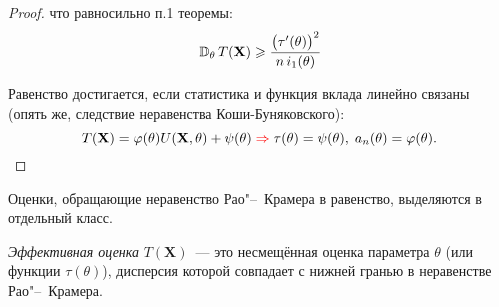\begin{proof}
    что равносильно п.1 теоремы:
    \begin{equation*}
        \mathbb{D}_{\theta}\, T(\mathbf{X}) \geqslant \cfrac{\bigl(\tau'(\theta)\bigr)^{2}}{n \, i_1(\theta)}
    \end{equation*}

    Равенство достигается, если статистика и функция вклада линейно связаны (опять же, следствие неравенства Коши-Буняковского):
    \begin{equation}
        \label{connection_of_efficient_estimator_and_score}
        T(\mathbf{X})=\varphi(\theta) U(\mathbf{X}, \theta)+\psi(\theta) 
        \; {\color{red}\Rightarrow } \;
        \tau(\theta)=\psi(\theta), \; a_{n}(\theta)=\varphi(\theta).
    \end{equation}
\end{proof}

\iffalse
    Рассмотрим некоторый класс оценок $K=\left\{\hat{\theta}\left(\mathbf{X}\right)\right\}$ параметра $\theta$.
    \begin{defn}
        Говорят, что оценка $\theta^{*}\left(\mathbf{X}\right) \in K$ является эффективной оценкой параметра $\theta$ в классе $K$, если для любой другой оценки $\hat{\theta} \in K$ имеет место неравенство:
        \begin{equation*}
            E\left(\theta^{*}-\theta\right)^{2} \leqslant \MExp(\hat{\theta}-\theta)^{2}~ \forall \theta \in \Theta
        \end{equation*}
    \end{defn}
    Обозначим класс несмещённых оценок:
    \begin{equation*}
        K_{0}=\left\{\hat{\theta}\left(\mathbf{X}\right): E \hat{\theta}=\theta, \forall \theta \in \Theta\right\}
    \end{equation*}
    Оценка, эффективная в $K_0$ называется просто \textit{эффективной}.

    Для оценки $\theta^{*} \in K_{0}$ по определению дисперсии
    \begin{equation*}
        \MExp\left(\theta^{*}-\theta\right)^{2}=\MExp\left(\theta^{*}-\MExp \theta^{*}\right)^{2}=\Var \theta^{*}
    \end{equation*}
\fi

Оценки, обращающие неравенство Рао"--~Крамера в равенство, выделяются в отдельный класс.
\begin{defn}
    \textit{Эффективная оценка} $T(\mathbf{X})$~--- это несмещённая оценка параметра $\theta$ (или функции $\tau(\theta)$), дисперсия которой совпадает с нижней гранью в неравенстве Рао"--~Крамера.
\end{defn}

